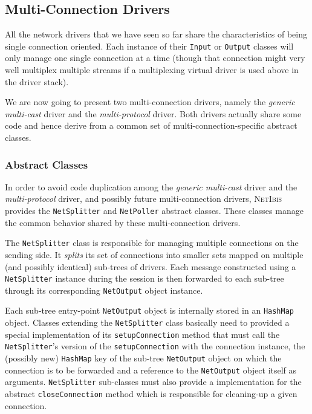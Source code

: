 \documentclass[11pt]{book}
\def\NetIbis{\textsc{NetIbis}\xspace}
\begin{document}
\subsection{Multi-Connection Drivers}
\label{sec:multi-conn-driv}
All the network drivers that we have seen so far share the
characteristics of being single connection oriented. Each instance of
their \texttt{Input} or \texttt{Output} classes will only manage one
single connection at a time (though that connection might very well
multiplex multiple streams if a multiplexing virtual driver is used
above in the driver stack).

We are now going to present two multi-connection drivers, namely the
\emph{generic multi-cast} driver and the \emph{multi-protocol} driver.
Both drivers actually share some code and hence derive from a common
set of multi-connection-specific abstract classes.

%
\subsubsection{Abstract Classes}
\label{sec:abstract-classes}
In order to avoid code duplication among the \emph{generic multi-cast}
driver and the \emph{multi-protocol} driver, and possibly future
multi-connection drivers, \NetIbis provides the \texttt{NetSplitter}
and \texttt{NetPoller} abstract classes. These classes manage the
common behavior shared by these multi-connection drivers.

The \texttt{NetSplitter} class is responsible for managing multiple
connections on the sending side. It \emph{splits} its set of
connections into smaller sets mapped on multiple (and possibly
identical) sub-trees of drivers. Each message constructed using a
\texttt{NetSplitter} instance during the session is then forwarded to
each sub-tree through its corresponding \texttt{NetOutput} object
instance. 

Each sub-tree entry-point \texttt{NetOutput} object is internally
stored in an \texttt{HashMap} object. Classes extending the
\texttt{NetSplitter} class basically need to provided a special
implementation of its \texttt{setupConnection} method that must call
the \texttt{NetSplitter}'s version of the \texttt{setupConnection}
with the connection instance, the (possibly new) \texttt{HashMap} key
of the sub-tree \texttt{NetOutput} object on which the connection is
to be forwarded and a reference to the \texttt{NetOutput} object
itself as arguments. \texttt{NetSplitter} sub-classes must also
provide a implementation for the abstract \texttt{closeConnection}
method which is responsible for cleaning-up a given connection.
\end{document}
